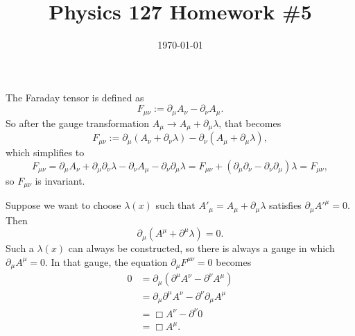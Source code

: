\documentclass{article}
\date{\today}
\title{Physics 127 Homework \#5}
\begin{document}
\maketitle

\begin{prob}
\end{prob}
The Faraday tensor is defined as
\[ F_{\mu \nu} := \partial_\mu A_\nu - \partial_\nu A_\mu. \]
So after the gauge transformation $A_\mu \rightarrow A_\mu + \partial_\mu \lambda$, that becomes
\[ F_{\mu \nu} := \partial_\mu (A_\nu + \partial_\nu \lambda) - \partial_\nu (A_\mu + \partial_\mu \lambda), \]
which simplifies to
\[ F_{\mu \nu} = \partial_\mu A_\nu + \partial_\mu \partial_\nu \lambda - \partial_\nu A_\mu - \partial_\nu \partial_\mu \lambda = F_{\mu \nu} + (\partial_\mu \partial_\nu - \partial_\nu \partial_\mu) \lambda = F_{\mu \nu}, \]
so $F_{\mu \nu}$ is invariant.
\par
Suppose we want to choose $\lambda(x)$ such that $A'_\mu = A_\mu + \partial_\mu \lambda$ satisfies $\partial_\mu A'^\mu = 0$. Then
\[ \partial_\mu (A^\mu + \partial^\mu \lambda) = 0. \]
Such a $\lambda(x)$ can always be constructed, so there is always a gauge in which $\partial_\mu A^\mu = 0$. In that gauge, the equation $\partial_\mu F^{\mu \nu} = 0$ becomes
\begin{align*}
    0 &= \partial_\mu (\partial^\mu A^\nu - \partial^\nu A^\mu) \\
      &= \partial_\mu \partial^\mu A^\nu - \partial^\nu \partial_\mu A^\mu \\
      &= \Box A^\nu - \partial^\nu 0 \\
      &= \Box A^\mu.
\end{align*}
\end{document}
